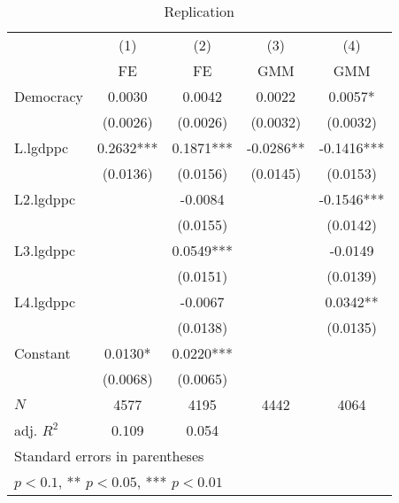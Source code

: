 \begin{table}[htbp]\centering
\def\sym#1{\ifmmode^{#1}\else\(^{#1}\)\fi}
\caption{Replication \label{tab:regression1}}
\begin{tabular}{l*{4}{c}}
\hline\hline
            &\multicolumn{1}{c}{(1)}&\multicolumn{1}{c}{(2)}&\multicolumn{1}{c}{(3)}&\multicolumn{1}{c}{(4)}\\
            &\multicolumn{1}{c}{FE}&\multicolumn{1}{c}{FE}&\multicolumn{1}{c}{GMM}&\multicolumn{1}{c}{GMM}\\
\hline
Democracy   &      0.0030   &      0.0042   &      0.0022   &      0.0057*  \\
            &    (0.0026)   &    (0.0026)   &    (0.0032)   &    (0.0032)   \\
[1em]
L.lgdppc    &      0.2632***&      0.1871***&     -0.0286** &     -0.1416***\\
            &    (0.0136)   &    (0.0156)   &    (0.0145)   &    (0.0153)   \\
[1em]
L2.lgdppc   &               &     -0.0084   &               &     -0.1546***\\
            &               &    (0.0155)   &               &    (0.0142)   \\
[1em]
L3.lgdppc   &               &      0.0549***&               &     -0.0149   \\
            &               &    (0.0151)   &               &    (0.0139)   \\
[1em]
L4.lgdppc   &               &     -0.0067   &               &      0.0342** \\
            &               &    (0.0138)   &               &    (0.0135)   \\
[1em]
Constant    &      0.0130*  &      0.0220***&               &               \\
            &    (0.0068)   &    (0.0065)   &               &               \\
\hline
\(N\)       &        4577   &        4195   &        4442   &        4064   \\
adj. \(R^{2}\)&       0.109   &       0.054   &               &               \\
\hline\hline
\multicolumn{5}{l}{\footnotesize Standard errors in parentheses}\\
\multicolumn{5}{l}{\footnotesize * \(p<0.1\), ** \(p<0.05\), *** \(p<0.01\)}\\
\end{tabular}
\end{table}
